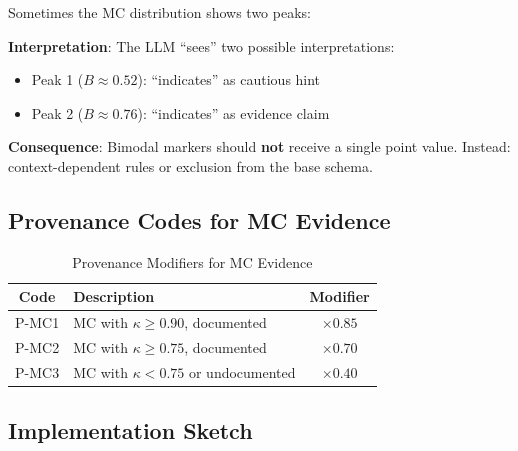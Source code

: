 \documentclass[11pt,a4paper]{article}
\begin{document}
Sometimes the MC distribution shows two peaks:

\begin{center}
\end{center}

\textbf{Interpretation}: The LLM ``sees'' two possible interpretations:
\begin{itemize}
    \item Peak 1 ($B \approx 0.52$): ``indicates'' as cautious hint
    \item Peak 2 ($B \approx 0.76$): ``indicates'' as evidence claim
\end{itemize}

\textbf{Consequence}: Bimodal markers should \textbf{not} receive a single point value. Instead: context-dependent rules or exclusion from the base schema.

\subsection{Provenance Codes for MC Evidence}

\begin{table}[h]
\centering
\caption{Provenance Modifiers for MC Evidence}
\label{tab:mc-provenance}
\begin{tabular}{clc}
\toprule
\textbf{Code} & \textbf{Description} & \textbf{Modifier} \\
\midrule
P-MC1 & MC with $\kappa \geq 0.90$, documented & $\times 0.85$ \\
P-MC2 & MC with $\kappa \geq 0.75$, documented & $\times 0.70$ \\
P-MC3 & MC with $\kappa < 0.75$ or undocumented & $\times 0.40$ \\
\bottomrule
\end{tabular}
\end{table}

\subsection{Implementation Sketch}
\end{document}
